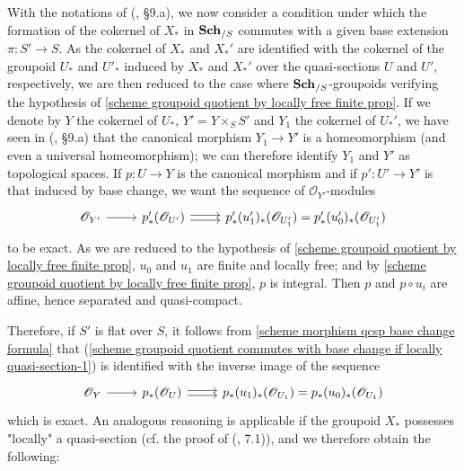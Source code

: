 With the notations of (\cite{SGA3-1},  \S 9.a), we now consider a condition under which the formation of the cokernel of $X_*$ in $\mathbf{Sch}_{/S}$ commutes with a given base extension $\pi:S'\to S$. As the cokernel of $X_*$ and $X_*'$ are identified with the cokernel of the groupoid $U_*$ and $U'_*$ induced by $X_*$ and $X_*'$ over the quasi-sections $U$ and $U'$, respectively, we are then reduced to the case where $\mathbf{Sch}_{/S}$-groupoids verifying the hypothesis of \cref{scheme groupoid quotient by locally free finite prop}. If we denote by $Y$ the cokernel of $U_*$, $Y'=Y\times_SS'$ and $Y_1$ the cokernel of $U_*'$, we have seen in (\cite{SGA3-1},  \S 9.a) that the canonical morphism $Y_1\to Y'$ is a homeomorphism (and even a universal homeomorphism); we can therefore identify $Y_1$ and $Y'$ as topological spaces. If $p:U\to Y$ is the canonical morphism and if $p':U'\to Y'$ is that induced by base change, we want the sequence of $\mathscr{O}_{Y'}$-modules
\begin{equation}\label{scheme groupoid quotient commutes with base change if locally quasi-section-1}
\begin{tikzcd}
\mathscr{O}_{Y'}\ar[r]&p'_*(\mathscr{O}_{U'})\ar[r,shift left=2pt]\ar[r,shift right=2pt]&p'_*(u_1')_*(\mathscr{O}_{U_1'})=p'_*(u_0')_*(\mathscr{O}_{U_1'})
\end{tikzcd}
\end{equation}
to be exact. As we are reduced to the hypothesis of \cref{scheme groupoid quotient by locally free finite prop}, $u_0$ and $u_1$ are finite and locally free; and by \cref{scheme groupoid quotient by locally free finite prop}, $p$ is integral. Then $p$ and $p\circ u_i$ are affine, hence separated and quasi-compact.\par
Therefore, if $S'$ is flat over $S$, it follows from \cref{scheme morphism qcsp base change formula} that (\ref{scheme groupoid quotient commutes with base change if locally quasi-section-1}) is identified with the inverse image of the sequence
\begin{equation}\label{scheme groupoid quotient commutes with base change if locally quasi-section-2}
\begin{tikzcd}
\mathscr{O}_{Y}\ar[r]&p_*(\mathscr{O}_{U})\ar[r,shift left=2pt]\ar[r,shift right=2pt]&p_*(u_1)_*(\mathscr{O}_{U_1})=p_*(u_0)_*(\mathscr{O}_{U_1})
\end{tikzcd}
\end{equation}
which is exact. An analogous reasoning is applicable if the groupoid $X_*$ possesses "locally" a quasi-section (cf. the proof of (\cite{SGA3-1},  7.1)), and we therefore obtain the following:


